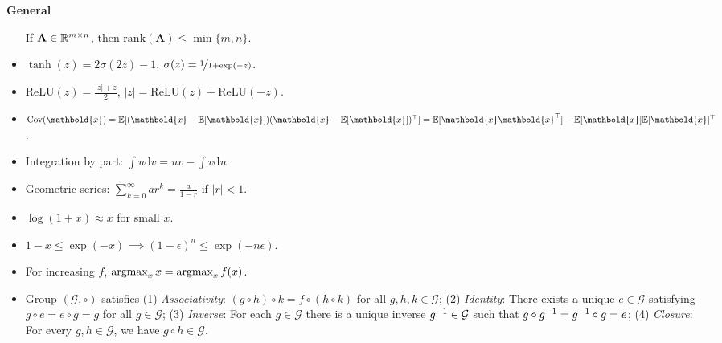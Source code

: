 \documentclass[10pt]{article}
\newenvironment{subtopic}[1]
{\vspace{0.1cm} \begin{center}\textbf{\footnotesize \sffamily #1}\end{center}}
{}
\renewcommand{\mat}[1]{\ensuremath{\mathbf{#1}}}
\renewcommand{\vec}[1]{\ensuremath{\mathbold{#1}}}
\begin{document}
\begin{multicols*}{3}
\begin{subtopic}{General}
\begin{itemize}[left=0pt]
                If $\mat{A} \in \R^{m \times n}$, then $\mathrm{rank}(\mat{A}) \leq \min \{ m,n \}$.
            \item $\tanh(z) = 2 \sigma(2z) - 1$, $\sigma(z) = \nicefrac{1}{1+\exp(-z)}$.
            \item $\mathrm{ReLU}(z) = \frac{|z| + z}{2}$, $|z| = \mathrm{ReLU}(z) + \mathrm{ReLU}(-z)$.
            \item $\mathrm{Cov}(\vec{x}) = \E[(\vec{x}-\E[\vec{x}])\transpose{(\vec{x} - \E[\vec{x}])}] = \E[\vec{x}\transpose{\vec{x}}] - \E[\vec{x}] \transpose{\E[\vec{x}]}$.
            \item Integration by part: $\int u\mathrm{d}v = uv - \int v\mathrm{d}u$.
            \item Geometric series: $\sum_{k=0}^{\infty} ar^k = \frac{a}{1-r}$ if $|r| < 1$.
            \item $\log(1+x) \approx x$ for small $x$.
            \item $1-x \leq \exp(-x) \implies (1-\epsilon)^n \leq \exp(-n \epsilon)$.
            \item For increasing $f$, $\operatorname*{argmax}_{x} x = \operatorname*{argmax}_{x} f(x)$.
            \item Group $(\mathcal{G}, \circ)$ satisfies (1) \textit{Associativity}: $(g \circ h) \circ k = f
                    \circ (h \circ k)$ for all $g,h,k \in \mathcal{G}$; (2) \textit{Identity}: There exists a
                unique $e \in \mathcal{G}$ satisfying $g \circ e = e \circ g = g$ for all $g \in
                    \mathcal{G}$; (3) \textit{Inverse}: For each $g \in \mathcal{G}$ there is a unique inverse
                $g^{-1} \in \mathcal{G}$ such that $g \circ g^{-1}  = g^{-1} \circ g = e$; (4) \textit{Closure}:
                For every $g, h \in \mathcal{G}$, we have $g \circ h \in \mathcal{G}$.
        \end{itemize}
    \end{subtopic}


\end{multicols*}
\end{document}
